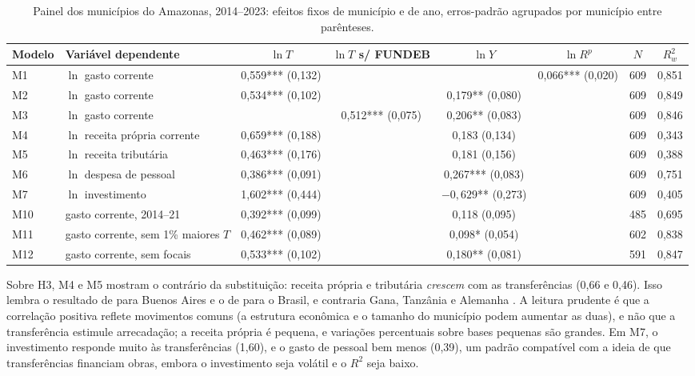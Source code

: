 \documentclass[10pt,twocolumn]{article}
\newcommand{\ep}[1]{{\scriptsize(#1)}}
\begin{document}
\begin{table}[t]
\centering\footnotesize
\caption{Painel dos municípios do Amazonas, 2014--2023: efeitos fixos de município e de ano, erros-padrão agrupados por município entre parênteses.}\label{tab:reg}
\begin{tabular}{llcccccc}
\toprule
Modelo & Variável dependente & $\ln T$ & $\ln T$ s/ FUNDEB & $\ln Y$ & $\ln R^p$ & $N$ & $R^2_w$\\
\midrule
M1 & $\ln$ gasto corrente & 0,559*** \ep{0,132} & & & 0,066*** \ep{0,020} & 609 & 0,851\\
M2 & $\ln$ gasto corrente & 0,534*** \ep{0,102} & & 0,179** \ep{0,080} & & 609 & 0,849\\
M3 & $\ln$ gasto corrente & & 0,512*** \ep{0,075} & 0,206** \ep{0,083} & & 609 & 0,846\\
M4 & $\ln$ receita própria corrente & 0,659*** \ep{0,188} & & 0,183 \ep{0,134} & & 609 & 0,343\\
M5 & $\ln$ receita tributária & 0,463*** \ep{0,176} & & 0,181 \ep{0,156} & & 609 & 0,388\\
M6 & $\ln$ despesa de pessoal & 0,386*** \ep{0,091} & & 0,267*** \ep{0,083} & & 609 & 0,751\\
M7 & $\ln$ investimento & 1,602*** \ep{0,444} & & $-0{,}629$** \ep{0,273} & & 609 & 0,405\\
M10 & gasto corrente, 2014--21 & 0,392*** \ep{0,099} & & 0,118 \ep{0,095} & & 485 & 0,695\\
M11 & gasto corrente, sem 1\% maiores $T$ & 0,462*** \ep{0,089} & & 0,098* \ep{0,054} & & 602 & 0,838\\
M12 & gasto corrente, sem focais & 0,533*** \ep{0,102} & & 0,180** \ep{0,081} & & 591 & 0,847\\
\bottomrule
\end{tabular}

\end{table}

Sobre H3, M4 e M5 mostram o contrário da substituição: receita própria e tributária \textit{crescem} com as transferências (0,66 e 0,46). Isso lembra o resultado de \citet{porto2023} para Buenos Aires e o de \citet{litschig2013} para o Brasil, e contraria Gana, Tanzânia e Alemanha \citep{mogues2012,masaki2018,baretti2002}. A leitura prudente é que a correlação positiva reflete movimentos comuns (a estrutura econômica e o tamanho do município podem aumentar as duas), e não que a transferência estimule arrecadação; a receita própria é pequena, e variações percentuais sobre bases pequenas são grandes. Em M7, o investimento responde muito às transferências (1,60), e o gasto de pessoal bem menos (0,39), um padrão compatível com a ideia de que transferências financiam obras, embora o investimento seja volátil e o $R^2$ seja baixo.
\end{document}
